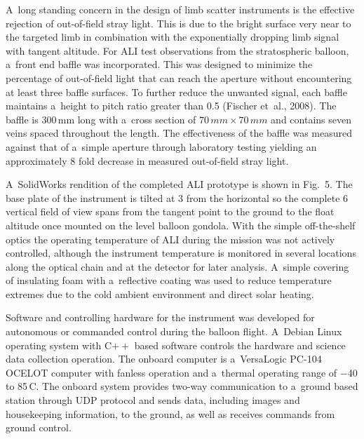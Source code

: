 \documentclass[amtd, online, hvmath]{copernicus}
\begin{document}
A~long standing concern in the design of limb scatter instruments is
the effective rejection of out-of-field stray light. This is due to
the bright surface very near to the targeted limb in combination with
the exponentially dropping limb signal with tangent altitude. For ALI
test observations from the stratospheric balloon, a~front end baffle
was incorporated. This was designed to minimize the percentage of
out-of-field light that can reach the aperture without encountering at
least three baffle surfaces. To further reduce the unwanted signal,
each baffle maintains a~height to pitch ratio greater than 0.5
(Fischer et~al., 2008). The baffle is 300\,\unit{mm} long with a~cross
section of $70\,\unit{mm} \times 70\,\unit{mm}$ and contains seven
veins spaced throughout the length. The effectiveness of the baffle
was measured against that of a~simple aperture through laboratory
testing yielding an approximately 8 fold decrease in measured
out-of-field stray light.

A~SolidWorks rendition of the completed ALI prototype is shown in
Fig.~5.  The base plate of the instrument is tilted at 3{\degree} from
the horizontal so the complete 6{\degree} vertical field of view spans
from the tangent point to the ground to the float altitude once
mounted on the level balloon gondola.  With the simple off-the-shelf
optics the operating temperature of ALI during the mission was not
actively controlled, although the instrument temperature is monitored
in several locations along the optical chain and at the detector for
later analysis. A~simple covering of insulating foam with a~reflective
coating was used to reduce temperature extremes due to the cold
ambient environment and direct solar heating.

Software and controlling hardware for the instrument was developed for
autonomous or commanded control during the balloon flight. A~Debian
Linux operating system with C$++$ based software controls the hardware
and science data collection operation. The onboard computer is
a~VersaLogic PC-104 OCELOT computer with fanless operation and
a~thermal operating range of $-$40 to 85\,{\degree}C. The onboard
system provides two-way communication to a~ground based station
through UDP protocol and sends data, including images and housekeeping
information, to the ground, as well as receives commands from ground
control.
\end{document}
